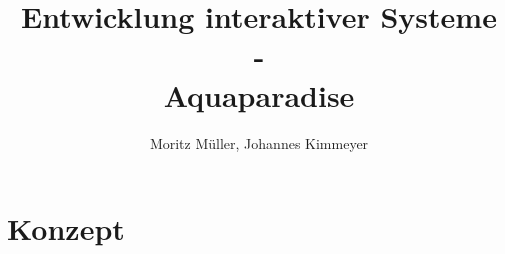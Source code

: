 \documentclass[12pt,a4paper,ngerman]{scrreprt}
\begin{document}
 \title{Entwicklung interaktiver Systeme\\
  -\\
 Aquaparadise}
\author{Moritz Müller, Johannes Kimmeyer}
\maketitle
\tableofcontents
















\listoftables \listoffigures
\printbibliography
\appendix



\chapter{Konzept}

\label{app:uiprototyp}
\end{document}
